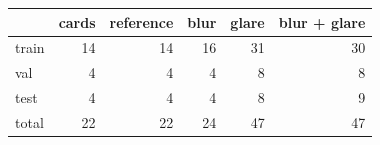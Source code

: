 \begin{tabular}{lrrrrr}
\toprule
 & cards & reference & blur & glare & blur + glare \\
\midrule
train & 14 & 14 & 16 & 31 & 30 \\
val & 4 & 4 & 4 & 8 & 8 \\
test & 4 & 4 & 4 & 8 & 9 \\
\midrule
total & 22 & 22 & 24 & 47 & 47 \\
\bottomrule
\end{tabular}
